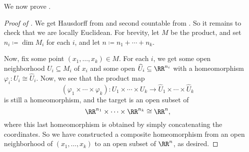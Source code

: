 \documentclass[../notes.tex]{subfiles}
\begin{document}
We now prove .
\begin{proof}[Proof of ]
	We get Hausdorff from  and second countable from . So it remains to check that we are locally Euclidean. For brevity, let $M$ be the product, and set $n_i\coloneqq\dim M_i$ for each $i$, and let $n\coloneqq n_1+\cdots+n_k$.

	Now, fix some point $(x_1,\ldots,x_k)\in M$. For each $i$, we get some open neighborhood $U_i\subseteq M_i$ of $x_i$ and some open $\widehat{U}_i\subseteq\RR^{n_i}$ with a homeomorphism $\varphi_i\colon U_i\cong\widehat U_i$. Now, we see that the product map
	\[(\varphi_1\times\cdots\times\varphi_k)\colon U_1\times\cdots\times U_k\to\widehat U_1\times\cdots\times\widehat U_k\]
	is still a homeomorphism, and the target is an open subset of
	\[\RR^{n_1}\times\cdots\times\RR^{n_k}\cong\RR^n,\]
	where this last homeomorphism is obtained by simply concatenating the coordinates. So we have constructed a composite homeomorphism from an open neighborhood of $(x_1,\ldots,x_k)$ to an open subset of $\RR^n$, as desired.
\end{proof}
\end{document}
